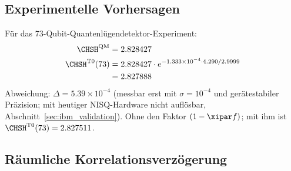 \subsection{Experimentelle Vorhersagen}
\label{sec:experiments}
\begin{experimentbox}
	Für das 73-Qubit-Quantenlügendetektor-Experiment:
	\begin{align}
		\CHSH^{\text{QM}} &= 2.828427 \\
		\CHSH^{\text{T0}}(73) &= 2.828427 \cdot e^{-1.333 \times 10^{-4} \cdot 4.290/2.9999} \\
		&= 2.827888
	\end{align}
	Abweichung: $\Delta = 5.39 \times 10^{-4}$ (messbar erst mit $\sigma = 10^{-4}$ und gerätestabiler Präzision; mit heutiger NISQ-Hardware nicht auflösbar, Abschnitt~\ref{sec:ibm_validation}). Ohne den Faktor $(1 - \xipar f)$; mit ihm ist $\CHSH^{\text{T0}}(73) = 2.827511$.
\end{experimentbox}

\begin{table}[h]
	\centering
	\caption{T0 CHSH-Vorhersagen für Multi-Qubit-Systeme (Spalte \glqq Testbar\grqq: mit fehlerkorrigierter Hardware; mit heutiger NISQ-Hardware ist keiner der Werte auflösbar)}
	\label{tab:chsh_predictions}
\end{table}

\subsection{Räumliche Korrelationsverzögerung}
\label{sec:spatial_delay}

